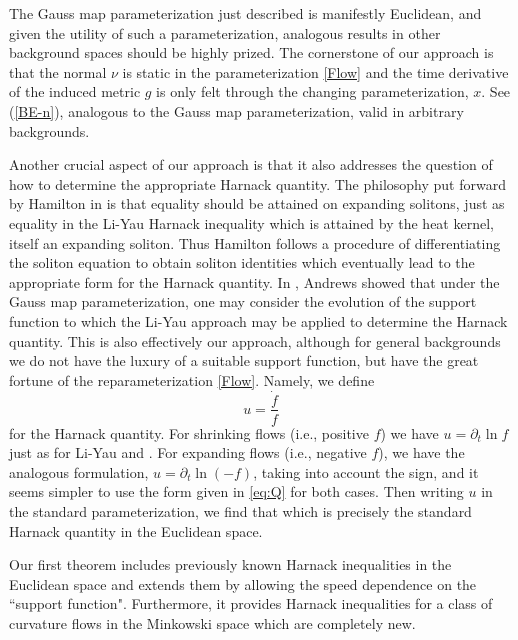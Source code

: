 The Gauss map parameterization just described is manifestly Euclidean, and given the utility of such a parameterization, analogous results in other background spaces should be highly prized. The cornerstone of our approach is that the normal \(\nu\) is static in the parameterization \eqref{Flow} and the time derivative of the induced metric \(g\) is only felt through the changing parameterization, $x$. See (\ref{BE-n}), analogous to the Gauss map parameterization, valid in arbitrary backgrounds.

Another crucial aspect of our approach is that it also addresses the question of how to determine the appropriate Harnack quantity. The philosophy put forward by Hamilton in \cite{Hamilton:/1993,Hamilton:/1995} is that equality should be attained on expanding solitons, just as equality in the Li-Yau Harnack inequality \cite{LiYau:/1986} which is attained by the heat kernel, itself an expanding soliton. Thus Hamilton follows a procedure of differentiating the soliton equation to obtain soliton identities which eventually lead to the appropriate form for the Harnack quantity. In \cite{Andrews:09/1994}, Andrews showed that under the Gauss map parameterization, one may consider the evolution of the support function to which the Li-Yau approach may be applied to determine the Harnack quantity. This is also effectively our approach, although for general backgrounds we do not have the luxury of a suitable support function, but have the great fortune of the reparameterization \eqref{Flow}. Namely, we define
\begin{equation}
\label{eq:Q}
u = \frac{\dot{f}}{f}
\end{equation}
for the Harnack quantity. For shrinking flows (i.e., positive $f$) we have $u = \partial_t \ln f$ just as for Li-Yau \cite{LiYau:/1986} and \cite{Andrews:09/1994}. For expanding flows (i.e., negative $f$), we have the analogous formulation, $u =\partial_t \ln (-f)$, taking into account the sign, and it seems simpler to use the form given in \eqref{eq:Q} for both cases. Then writing $u$ in the standard parameterization, we find that
which is precisely the standard Harnack quantity in the Euclidean space.


Our first theorem includes previously known Harnack inequalities in the Euclidean space and extends them by allowing the speed dependence on the ``support function". Furthermore, it provides Harnack inequalities for a class of curvature flows in the Minkowski space which are completely new.

